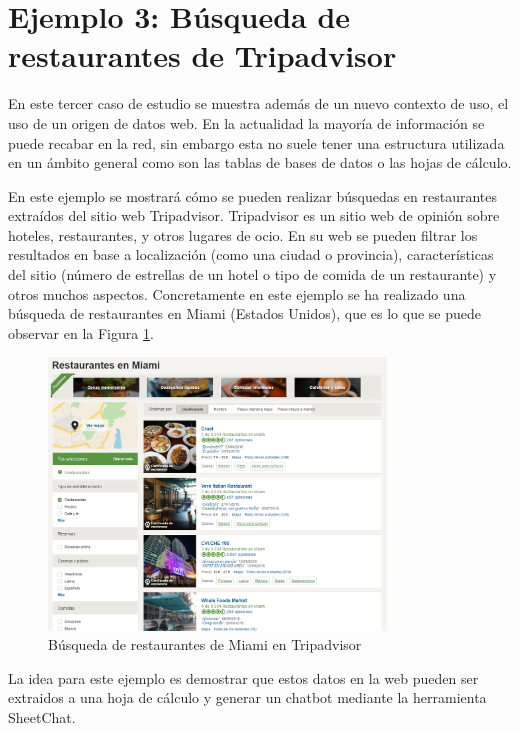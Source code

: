 \section{Ejemplo 3: Búsqueda de restaurantes de Tripadvisor}

En este tercer caso de estudio se muestra además de un nuevo contexto de uso, el uso de un origen de datos web. En la actualidad la mayoría de información se puede recabar en la red, sin embargo esta no suele tener una estructura utilizada en un ámbito general como son las tablas de bases de datos o las hojas de cálculo.

En este ejemplo se mostrará cómo se pueden realizar búsquedas en restaurantes extraídos del sitio web Tripadvisor. Tripadvisor es un sitio web de opinión sobre hoteles, restaurantes, y otros lugares de ocio. En su web se pueden filtrar los resultados en base a localización (como una ciudad o provincia), características del sitio (número de estrellas de un hotel o tipo de comida de un restaurante) y otros muchos aspectos. Concretamente en este ejemplo se ha realizado una búsqueda de restaurantes en Miami (Estados Unidos), que es lo que se puede observar en la Figura \ref{fig:TripadvisorMiami}.

\begin{figure}[htb]
	\centering
	\includegraphics[width=0.8\textwidth]{./figs/tripadvisorMiami.png}
	\caption{Búsqueda de restaurantes de Miami en Tripadvisor}
	\label{fig:TripadvisorMiami}
\end{figure}

La idea para este ejemplo es demostrar que estos datos en la web pueden ser extraidos a una hoja de cálculo y generar un chatbot mediante la herramienta SheetChat.

